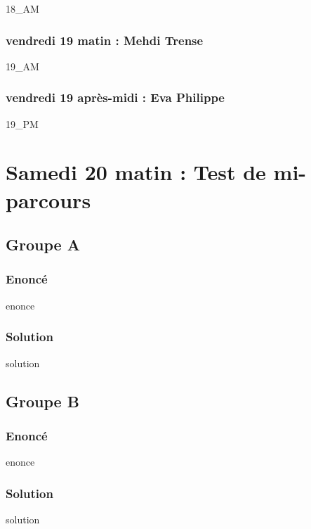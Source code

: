 \documentclass[12pt,A4]{book}
\theoremstyle{definition}
\theoremstyle{thm}
\theoremstyle{def}
\newcounter{sol}[subsection]
\begin{document}
{18_AM}

\subsection{vendredi 19 matin : Mehdi Trense}

{19_AM}

\subsection{vendredi 19 après-midi : Eva Philippe}

{19_PM}





\chapter{Samedi 20 matin : Test de mi-parcours}
\minitoc \bigskip


\section{Groupe A}

\subsection{Enoncé}

{enonce}

\subsection{Solution}

{solution}


\section{Groupe B}

\subsection{Enoncé}

{enonce}

\subsection{Solution}

{solution}
\end{document}
